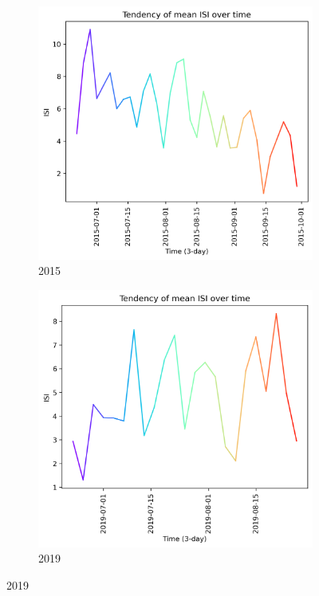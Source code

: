 \begin{figure}[h]
	\caption{ISI mean tendency graph}
	\centering
	\begin{subfigure}{0.49\textwidth}
		\centering
		\includegraphics[width=\textwidth]{graphs/2015/tendency/2015_tendency_graph_ISI.png}
		\caption{2015}
		\label{fig:mean_tendency_isi_2015}
	\end{subfigure}
	\hfill
	\begin{subfigure}{0.49\textwidth}
		\centering
		\includegraphics[width=\textwidth]{graphs/2019/tendency/2019_tendency_graph_ISI.png}
		\caption{2019}
		\label{fig:mean_tendency_isi_2019}
	\end{subfigure}
	\label{fig:mean_tendency_isi}
\end{figure}

